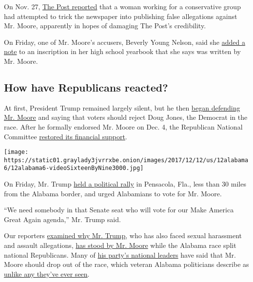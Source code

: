 On Nov. 27,
\href{https://www.washingtonpost.com/investigations/a-woman-approached-the-post-with-dramatic—and-false--tale-about-roy-moore-sje-appears-to-be-part-of-undercover-sting-operation/2017/11/27/0c2e335a-cfb6-11e7-9d3a-bcbe2af58c3a_story.html?utm_term=.1c605c2cd9a0}{The
Post reported} that a woman working for a conservative group had
attempted to trick the newspaper into publishing false allegations
against Mr. Moore, apparently in hopes of damaging The Post's
credibility.

On Friday, one of Mr. Moore's accusers, Beverly Young Nelson, said she
\href{https://www.nytimes3xbfgragh.onion/2017/12/08/us/alabama-moore-nelson-allred.html}{added
a note} to an inscription in her high school yearbook that she says was
written by Mr. Moore.

\hypertarget{how-have-republicans-reacted}{%
\subsection{How have Republicans
reacted?}\label{how-have-republicans-reacted}}

At first, President Trump remained largely silent, but he then
\href{https://www.nytimes3xbfgragh.onion/2017/11/21/us/politics/roy-moore-trump-alabama.html}{began
defending Mr. Moore} and saying that voters should reject Doug Jones,
the Democrat in the race. After he formally endorsed Mr. Moore on Dec.
4, the Republican National Committee
\href{https://www.nytimes3xbfgragh.onion/2017/12/04/us/politics/roy-moore-donald-trump.html?_r=0}{restored
its financial support}.

\texttt{[image: https://static01.graylady3jvrrxbe.onion/images/2017/12/12/us/12alabama6/12alabama6-videoSixteenByNine3000.jpg]}

On Friday, Mr. Trump
\href{https://www.nytimes3xbfgragh.onion/2017/12/08/us/politics/trump-moore-florida-alabama.html}{held
a political rally} in Pensacola, Fla., less than 30 miles from the
Alabama border, and urged Alabamians to vote for Mr. Moore.

``We need somebody in that Senate seat who will vote for our Make
America Great Again agenda,'' Mr. Trump said.

Our reporters
\href{https://www.nytimes3xbfgragh.onion/2017/11/25/us/politics/trump-roy-moore-mcconnell-alabama-senate.html}{examined
why Mr. Trump}, who has also faced sexual harassment and assault
allegations,
\href{https://www.nytimes3xbfgragh.onion/2017/11/25/us/politics/trump-roy-moore-mcconnell-alabama-senate.html}{has
stood by Mr. Moore} while the Alabama race split national Republicans.
Many of
\href{https://www.nytimes3xbfgragh.onion/2017/11/10/us/politics/roy-moore-alabama-republican.html}{his
party's national leaders} have said that Mr. Moore should drop out of
the race, which veteran Alabama politicians describe as
\href{https://www.nytimes3xbfgragh.onion/2017/12/09/us/politics/even-in-unruly-alabama-politics-never-seen-anything-like-this.html}{unlike
any they've ever seen}.

